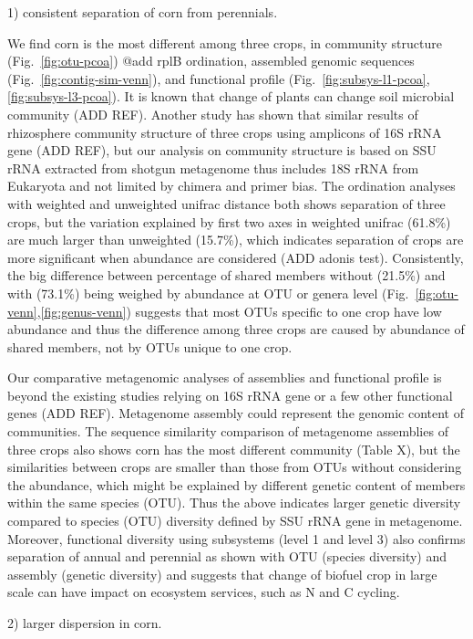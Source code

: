 \documentclass[12pt]{article}
\begin{document}
1) consistent separation of corn from perennials.

We find corn is the most different among three crops, in community structure (Fig.~\ref{fig:otu-pcoa}) @add rplB ordination, assembled genomic sequences (Fig.~\ref{fig:contig-sim-venn}), and functional profile (Fig.~\ref{fig:subsys-l1-pcoa},\ref{fig:subsys-l3-pcoa}). It is known that change of plants can change soil microbial community (ADD REF). Another study has shown that similar results of rhizosphere community structure of three crops using amplicons of 16S rRNA gene (ADD REF), but our analysis on community structure is based on SSU rRNA extracted from shotgun metagenome thus includes 18S rRNA from Eukaryota and not limited by chimera and primer bias. The ordination analyses with weighted and unweighted unifrac distance both shows separation of three crops, but the variation explained by first two axes in weighted unifrac (61.8\%) are much larger than unweighted (15.7\%), which indicates separation of crops are more significant when abundance are considered (ADD adonis test). Consistently, the big difference between percentage of shared members without (21.5\%) and with (73.1\%) being weighed by abundance at OTU or genera level (Fig.~\ref{fig:otu-venn},\ref{fig:genus-venn}) suggests that most OTUs specific to one crop have low abundance and thus the difference among three crops are caused by abundance of shared members, not by OTUs unique to one crop. 

Our comparative metagenomic analyses of assemblies and functional profile is beyond the existing studies relying on 16S rRNA gene or a few other functional genes (ADD REF). Metagenome assembly could represent the genomic content of communities. The sequence similarity comparison of metagenome assemblies of three crops also shows corn has the most different community (Table X), but the similarities between crops are smaller than those from OTUs without considering the abundance, which might be explained by different genetic content of members within the same species (OTU). Thus the above indicates larger genetic diversity compared to species (OTU) diversity defined by SSU rRNA gene in metagenome. Moreover, functional diversity using subsystems (level 1 and level 3) also confirms separation of annual and perennial as shown with OTU (species diversity) and assembly (genetic diversity) and suggests that change of biofuel crop in large scale can have impact on ecosystem services, such as N and C cycling.

2) larger dispersion in corn.
\end{document}
